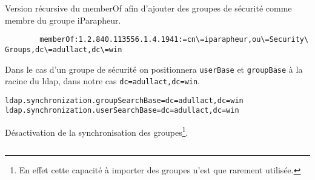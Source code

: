 Version récursive du memberOf afin d'ajouter des groupes de sécurité comme membre du groupe iParapheur.
\begin{codesnippet}
	\begin{verbatim}
		memberOf:1.2.840.113556.1.4.1941:=cn\=iparapheur,ou\=Security\ Groups,dc\=adullact,dc\=win 
	\end{verbatim}
\end{codesnippet}

Dans le cas d'un groupe de sécurité on positionnera \verb|userBase| et \verb|groupBase| à la racine du ldap, dans notre cas \verb|dc=adullact,dc=win|.
%
\begin{codesnippet}
\begin{verbatim}
ldap.synchronization.groupSearchBase=dc=adullact,dc=win
ldap.synchronization.userSearchBase=dc=adullact,dc=win
\end{verbatim}
\end{codesnippet}



Désactivation de la synchronisation des groupes\footnote{En effet cette capacité à importer des groupes n'est que rarement utilisée.}.
\inputminted[frame=single,linenos,fontsize=\footnotesize]{properties}{extraits/group_queries_no_sync.properties}

